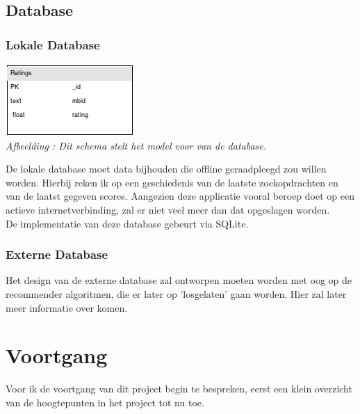 \documentclass[11pt,a4paper]{article}
\newcounter{figc}
\newcommand{\figID} {%
   \stepcounter{figc}%
   \thefigc}
\begin{document}
	\subsection{Database}
	\subsubsection{Lokale Database}
	\includegraphics[scale=1]{DatabaseScheme.png} \\
	\small \textit{Afbeelding \figID : Dit schema stelt het model voor van de database.} \\ \normalsize
	
De lokale database moet data bijhouden die offline geraadpleegd zou willen worden. Hierbij reken ik op een geschiedenis van de laatste zoekopdrachten en van de laatst gegeven scores. Aangezien deze applicatie vooral beroep doet op een actieve internetverbinding, zal er niet veel meer dan dat opgeslagen worden. \\
	 De implementatie van deze database gebeurt via SQLite.
	\subsubsection{Externe Database}
	Het design van de externe database zal ontworpen moeten worden met oog op de recommender algoritmen, die er later op 'losgelaten' gaan worden. Hier zal later meer informatie over komen.
		
\section{Voortgang}
Voor ik de voortgang van dit project begin te bespreken, eerst een klein overzicht van de hoogtepunten in het project tot nu toe. \\
\end{document}
